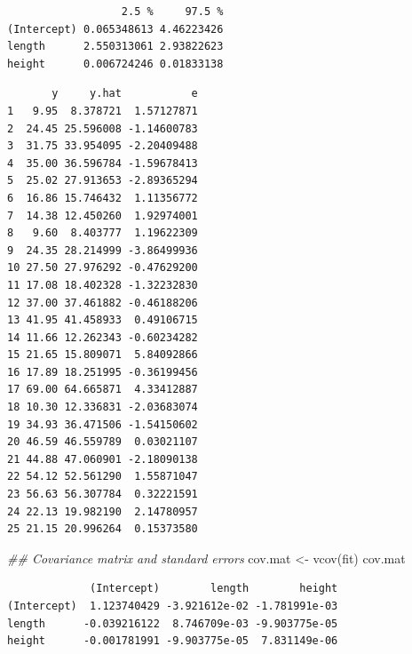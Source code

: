\documentclass[
  letterpaper,
]{scrbook}
\newenvironment{Shaded}{\begin{snugshade}}{\end{snugshade}}
\newcommand{\AttributeTok}[1]{\textcolor[rgb]{0.40,0.45,0.13}{#1}}
\newcommand{\DocumentationTok}[1]{\textcolor[rgb]{0.37,0.37,0.37}{\textit{#1}}}
\newcommand{\FunctionTok}[1]{\textcolor[rgb]{0.28,0.35,0.67}{#1}}
\newcommand{\NormalTok}[1]{\textcolor[rgb]{0.00,0.23,0.31}{#1}}
\newcommand{\OtherTok}[1]{\textcolor[rgb]{0.00,0.23,0.31}{#1}}
\newcommand{\SpecialCharTok}[1]{\textcolor[rgb]{0.37,0.37,0.37}{#1}}
\begin{document}
\begin{verbatim}
                  2.5 %     97.5 %
(Intercept) 0.065348613 4.46223426
length      2.550313061 2.93822623
height      0.006724246 0.01833138
\end{verbatim}

\begin{Shaded}
\end{Shaded}

\begin{verbatim}
       y     y.hat           e
1   9.95  8.378721  1.57127871
2  24.45 25.596008 -1.14600783
3  31.75 33.954095 -2.20409488
4  35.00 36.596784 -1.59678413
5  25.02 27.913653 -2.89365294
6  16.86 15.746432  1.11356772
7  14.38 12.450260  1.92974001
8   9.60  8.403777  1.19622309
9  24.35 28.214999 -3.86499936
10 27.50 27.976292 -0.47629200
11 17.08 18.402328 -1.32232830
12 37.00 37.461882 -0.46188206
13 41.95 41.458933  0.49106715
14 11.66 12.262343 -0.60234282
15 21.65 15.809071  5.84092866
16 17.89 18.251995 -0.36199456
17 69.00 64.665871  4.33412887
18 10.30 12.336831 -2.03683074
19 34.93 36.471506 -1.54150602
20 46.59 46.559789  0.03021107
21 44.88 47.060901 -2.18090138
22 54.12 52.561290  1.55871047
23 56.63 56.307784  0.32221591
24 22.13 19.982190  2.14780957
25 21.15 20.996264  0.15373580
\end{verbatim}

\begin{Shaded}
\begin{Highlighting}[]
\DocumentationTok{\#\# Covariance matrix and standard errors}
\NormalTok{cov.mat }\OtherTok{\textless{}{-}} \FunctionTok{vcov}\NormalTok{(fit)}
\NormalTok{cov.mat}
\end{Highlighting}
\end{Shaded}

\begin{verbatim}
             (Intercept)        length        height
(Intercept)  1.123740429 -3.921612e-02 -1.781991e-03
length      -0.039216122  8.746709e-03 -9.903775e-05
height      -0.001781991 -9.903775e-05  7.831149e-06
\end{verbatim}
\end{document}
